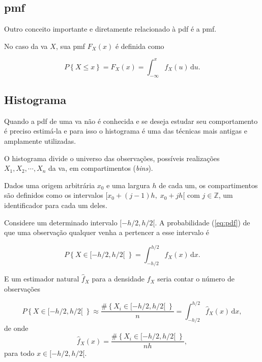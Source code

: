 \subsection{\Glsdesc{pmf}}
\label{sec:pmf}

Outro conceito importante e diretamente relacionado à \gls{pdf} é a
\gls{pmf}.

No caso da \gls{va} $X$, sua \gls{pmf} $F_X(x)$ é definida como

\begin{equation}
	P \left\{ X \leq x\right\} = F_X(x) = \int_{-\infty}^{x}\!f_X(u)\,\mathrm{d}u.
	\label{eq:pmf}
\end{equation}



\subsection{Histograma}
\label{sec:histogram}

Quando a \gls{pdf} de uma \gls{va} não é conhecida e se deseja estudar seu comportamento
é preciso estimá-la e para isso o histograma é uma das técnicas mais antigas e amplamente utilizadas.

O histograma divide o universo das observações, possíveis realizações $X_1, X_2,\cdots, X_n$
da \gls{va}, em compartimentos (\emph{bins}).

Dados uma origem arbitrária $x_0$ e uma largura $h$ de cada um, os compartimentos
são definidos como os intervalos $[x_0 + (j -1)h,\; x_0 + jh[$
com $j\in\mathbb{Z}$, um identificador para cada um deles.

Considere um determinado intervalo $[-h/2, h/2[$.
A probabilidade (\eqref{eq:pdf}) de que uma observação qualquer venha a pertencer a esse intervalo é

\begin{equation}
	P \left\{ X \in [-h/2,h/2[ \; \right\} = \int_{-h/2}^{h/2}\!f_X(x)\,\mathrm{d}x.
	\label{eq:hist01}
\end{equation}

E um estimador natural $\hat{f}_X$ para a densidade $f_X$ seria contar o número de observações

\begin{equation}
	P \left\{ X \in [-h/2,h/2[ \; \right\} \approx \frac{\# \left\{ X_i \in [-h/2,h/2[ \; \right\}}{n} =
	\int_{-h/2}^{h/2}\!\hat{f}_X(x)\,\mathrm{d}x ,
	\label{eq:hist02}
\end{equation}
de onde
\begin{equation}
	\hat{f}_X(x) = \frac{\# \left\{ X_i \in [-h/2,h/2[ \; \right\}}{nh},
	\label{eq:hist_03}
\end{equation}
para todo $x \in [-h/2,h/2[$.

